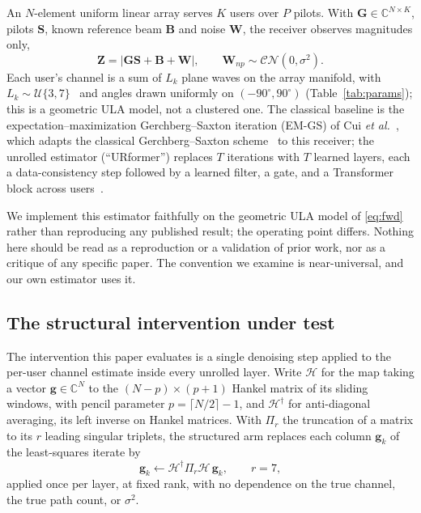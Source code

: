 \documentclass[journal]{IEEEtran}
\newcommand{\bG}{\mathbf{G}}
\newcommand{\bS}{\mathbf{S}}
\newcommand{\bB}{\mathbf{B}}
\newcommand{\bW}{\mathbf{W}}
\newcommand{\bZ}{\mathbf{Z}}
\newcommand{\bg}{\mathbf{g}}
\newcommand{\CN}{\mathcal{CN}}
\newcommand{\Hank}{\mathcal{H}}
\begin{document}
An $N$-element uniform linear array serves $K$ users over $P$ pilots. With
$\bG\in\mathbb{C}^{N\times K}$, pilots $\bS$, known reference beam $\bB$ and
noise $\bW$, the receiver observes magnitudes only,
\begin{equation}
\bZ=\left|\bG\bS+\bB+\bW\right|,\qquad \bW_{np}\sim\CN(0,\sigma^2).
\label{eq:fwd}
\end{equation}
Each user's channel is a sum of $L_k$ plane waves on the array manifold,
with $L_k\sim\mathcal{U}\{3,7\}$~\cite{xu2025} and angles drawn uniformly on
$(-90^\circ,90^\circ)$ (Table~\ref{tab:params}); this is a geometric ULA model,
not a clustered one. The
classical baseline is the expectation--maximization Gerchberg--Saxton iteration
(EM-GS) of Cui \emph{et al.}~\cite[Alg.~2]{cui2025}, which adapts the classical
Gerchberg--Saxton scheme~\cite{gerchberg1972} to this receiver; the unrolled estimator
(``URformer'') replaces $T$ iterations with $T$ learned layers, each a
data-consistency step followed by a learned filter, a gate, and a
Transformer block across users~\cite{xiao2026}.

We implement this estimator faithfully on the geometric ULA model of
\eqref{eq:fwd} rather than reproducing any published result; the operating
point differs. Nothing here should be read as a reproduction or a validation of
prior work, nor as a critique of any specific paper. The convention we examine
is near-universal, and our own estimator uses it.

\subsection{The structural intervention under test}
\label{sec:model}

The intervention this paper evaluates is a single denoising step applied to the
per-user channel estimate inside every unrolled layer. Write $\Hank$ for the
map taking a vector $\bg\in\mathbb{C}^{N}$ to the $(N-p)\times(p+1)$ Hankel
matrix of its sliding windows, with pencil parameter $p=\lceil N/2\rceil-1$,
and $\Hank^{\dagger}$ for anti-diagonal averaging, its left inverse on Hankel
matrices. With $\Pi_r$ the truncation of a matrix to its $r$ leading singular
triplets, the structured arm replaces each column $\bg_k$ of the least-squares
iterate by
\begin{equation}
\bg_k\leftarrow\Hank^{\dagger}\Pi_r\Hank\,\bg_k,\qquad r=7,
\label{eq:cadzow}
\end{equation}
applied once per layer, at fixed rank, with no dependence on the true channel,
the true path count, or $\sigma^2$.
\end{document}

